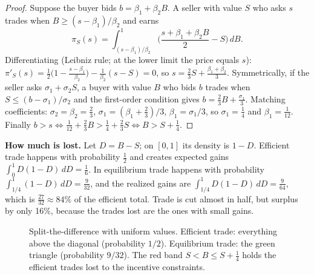 \begin{proof}
Suppose the buyer bids $b = \beta_1 + \beta_2 B$. A seller with value $S$ who asks $s$ trades when
$B \ge (s - \beta_1)/\beta_2$ and earns
\[
  \pi_S(s) = \int_{(s-\beta_1)/\beta_2}^{1} \Big(\frac{s + \beta_1 + \beta_2 B}{2} - S\Big)\, dB .
\]
Differentiating (Leibniz rule; at the lower limit the price equals $s$):
$\pi'_S(s) = \tfrac12\big(1 - \tfrac{s - \beta_1}{\beta_2}\big) - \tfrac{1}{\beta_2}(s - S) = 0$,
so $s = \tfrac23 S + \tfrac{\beta_1 + \beta_2}{3}$. Symmetrically, if the seller asks
$\sigma_1 + \sigma_2 S$, a buyer with value $B$ who bids $b$ trades when $S \le (b - \sigma_1)/\sigma_2$
and the first-order condition gives $b = \tfrac23 B + \tfrac{\sigma_1}{3}$. Matching
coefficients: $\sigma_2 = \beta_2 = \tfrac23$, $\sigma_1 = (\beta_1 + \tfrac23)/3$,
$\beta_1 = \sigma_1/3$, so $\sigma_1 = \tfrac14$ and $\beta_1 = \tfrac1{12}$. Finally
$b > s \iff \tfrac1{12} + \tfrac23 B > \tfrac14 + \tfrac23 S \iff B > S + \tfrac14$.
\end{proof}

\textbf{How much is lost.} Let $D = B - S$; on $[0,1]$ its density is $1 - D$. Efficient trade
happens with probability $\tfrac12$ and creates expected gains $\int_0^1 D(1-D)\,dD = \tfrac16$.
In equilibrium trade happens with probability $\int_{1/4}^{1}(1 - D)\,dD = \tfrac{9}{32}$, and the
realized gains are $\int_{1/4}^{1} D(1-D)\,dD = \tfrac{9}{64}$, which is $\tfrac{27}{32} \approx 84\%$
of the efficient total. Trade is cut almost in half, but surplus by only 16\%, because the trades
lost are the ones with small gains.

\begin{figure}[ht]
\centering
{}
\caption{Split-the-difference with uniform values. Efficient trade: everything above the
diagonal (probability $1/2$). Equilibrium trade: the green triangle (probability $9/32$). The red
band $S < B \le S + \frac14$ holds the efficient trades lost to the incentive constraints.}
\end{figure}


